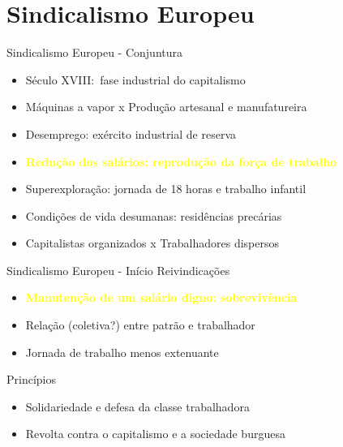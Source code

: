 \section{Sindicalismo Europeu}

\begin{frame}{Sindicalismo Europeu - Conjuntura}
    \begin{itemize}
        \item Século XVIII:\ fase industrial do capitalismo
        \item Máquinas a vapor x Produção artesanal e manufatureira
        \item Desemprego: exército industrial de reserva
        \item \textbf{\textcolor{yellow}{Redução dos salários: reprodução da força de trabalho}}
        \item Superexploração: jornada de 18 horas e trabalho infantil
        \item Condições de vida desumanas: residências precárias 
        \item Capitalistas organizados x Trabalhadores dispersos
    \end{itemize}
\end{frame}

\begin{frame}{Sindicalismo Europeu - Início}
    Reivindicações
    \begin{itemize}
        \item \textbf{\textcolor{yellow}{Manutenção de um salário digno: sobrevivência}}
        \item Relação (coletiva?) entre patrão e trabalhador
        \item Jornada de trabalho menos extenuante
    \end{itemize}
    Princípios
    \begin{itemize}
        \item Solidariedade e defesa da classe trabalhadora
        \item Revolta contra o capitalismo e a sociedade burguesa
    \end{itemize}
\end{frame}
